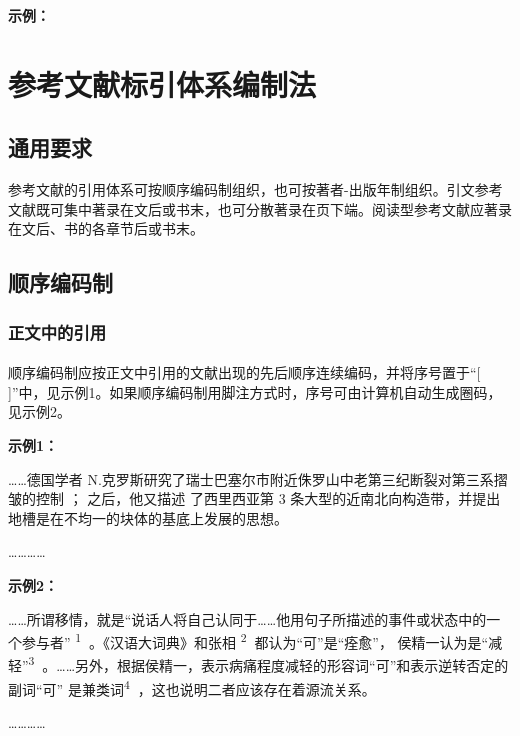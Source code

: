 \documentclass[twoside]{article}%
\begin{document}
\begin{refsection}

\nocite{肖玲2024数据,方向明2023元宇宙,JENKINS2012light}

\mbox{}{\small\textbf{示例：}\par}

{\printbibliography[heading=none,env=indentegenv]}

\end{refsection}


\section{参考文献标引体系编制法}\label{sec:citation:sys}

\subsection{通用要求}

参考文献的引用体系可按顺序编码制组织，也可按著者-出版年制组织。引文参考文献既可集中著录在文后或书末，也可分散著录在页下端。阅读型参考文献应著录在文后、书的各章节后或书末。

\subsection{顺序编码制}\label{sec:ref:numeric}

\subsubsection{正文中的引用}\label{sec:numeric:cite}

\paragraph{} 顺序编码制应按正文中引用的文献出现的先后顺序连续编码，并将序号置于“[ ]”中，见示例1。如果顺序编码制用脚注方式时，序号可由计算机自动生成圈码，见示例2。

\begin{refsection}
\small
\textbf{示例1：}

……德国学者 N.克罗斯研究了瑞士巴塞尔市附近侏罗山中老第三纪断裂对第三系摺皱的控制
\cite{Sunstein1996-903-903}； 之后，他又描述
了西里西亚第 3 条大型的近南北向构造带，并提出地槽是在不均一的块体的基底上发展的思想\cite{Morri2010--}。

…………

\textbf{示例2：}

……所谓移情，就是“说话人将自己认同于……他用句子所描述的事件或状态中的一个参与者”
\textsuperscript{\textcircled{1}}
。《汉语大词典》和张相
\textsuperscript{\textcircled{2}}
都认为“可”是“痊愈”，
侯精一认为是“减轻”\textsuperscript{\textcircled{3}}
。……另外，根据侯精一，表示病痛程度减轻的形容词“可”和表示逆转否定的副词“可”
是兼类词\textsuperscript{\textcircled{4}}
，这也说明二者应该存在着源流关系。

…………
\end{refsection}
\end{document}
